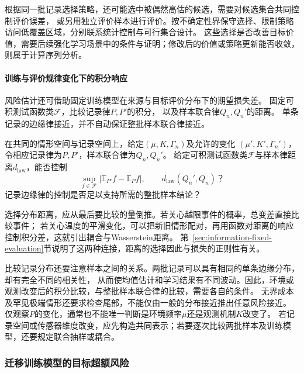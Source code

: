 根据同一批记录选择策略，还可能选中被偶然高估的候选，需要对候选集合共同控制评价误差，
或另用独立评价样本进行评价。按不确定性界保守选择、限制策略访问低覆盖区域，分别联系统计控制与可行集合设计。
这些选择是否改善目标价值，需要后续强化学习场景中的条件与证明；修改后的价值或策略更新能否收敛，则属于计算序列分析。

\paragraph{训练与评价规律变化下的积分响应}
\label{sec:future-analysis-data-law-perturbation}

风险估计还可借助固定训练模型在来源与目标评价分布下的期望损失差。
固定可积测试函数类$\mathcal F$，比较记录律$P,P'$的积分，
以及样本联合律$Q_n,Q_n'$的距离。
单条记录的边缘律接近，并不自动保证整批样本联合律接近。

\begin{mathproblem}[观测规律与风险积分的扰动]
  \label{question:future-data-law-perturbation}
  在共同的情形空间与记录空间上，给定$(\mu,K,\Gamma_n)$及允许的变化
  $(\mu',K',\Gamma_n')$，令相应记录律为$P,P'$，样本联合律为$Q_n,Q_n'$。
  给定可积测试函数类$\mathcal F$与样本律距离$d_{\mathrm{law}}$，能否控制
  \[
    \sup_{f\in\mathcal F}|\mathbb E_{P'}f-\mathbb E_Pf|,
    \qquad d_{\mathrm{law}}(Q_n',Q_n)\text{？}
  \]
  记录边缘律的控制是否足以支持所需的整批样本结论？
\end{mathproblem}

选择分布距离，应从最后要比较的量倒推。若关心越限事件的概率，总变差直接比较事件；
若关心温度的平滑变化，可以把新旧情形配对，再用函数对距离的响应控制积分差，这就引出耦合与Wasserstein距离。
第~\ref{sec:information-fixed-evaluation}节说明了这两种连接，距离的选择因此与损失的正则性有关。

比较记录分布还要注意样本之间的关系。两批记录可以具有相同的单条边缘分布，却有完全不同的相关性，
从而使均值估计和学习结果有不同波动。因此，环境或观测改变后的积分比较，与整批样本联合律的比较，需要各自的条件。
无界成本及罕见极端情形还要求检查尾部，不能仅由一般的分布接近推出任意风险接近。
仅观察$P$的变化，通常也不能唯一判断是环境频率$\mu$还是观测机制$K$改变了。
若记录空间或传感器维度改变，应先构造共同表示；若要逐次比较两批样本及训练模型，还要规定联合抽样或耦合。

\subsubsection{迁移训练模型的目标超额风险}
\label{sec:future-analysis-transfer-excess-risk}


